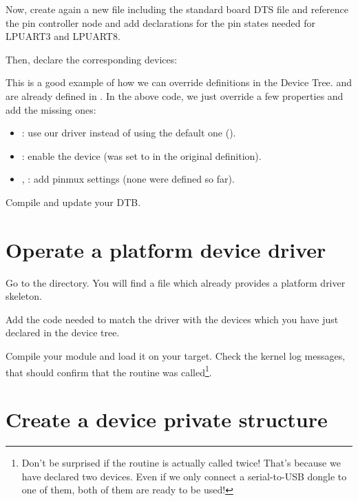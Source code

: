 Now, create again a new
 file including
the standard board DTS file and reference the pin controller node and add declarations for the pin states needed for LPUART3 and LPUART8.

{\scriptsize {}}

Then, declare the corresponding devices:


This is a good example of how we can override definitions in the Device
Tree.  and  are already defined in
. In the above code, we
just override a few properties and add the missing ones:

\begin{itemize}
\item {}: use our driver instead of using the default one
      ().
\item {}: enable the device (was set to  in
      the original definition).
\item {}, : add pinmux settings
      (none were defined so far).
\end{itemize}

Compile and update your DTB.

\section{Operate a platform device driver}

Go to the  directory.
You will find a  file which already provides a platform
driver skeleton.

Add the code needed to match the driver with the devices which you have
just declared in the device tree.

Compile your module and load it on your target. Check the kernel log
messages, that should confirm that the  routine was
called\footnote{Don't be surprised if the  routine is
actually called twice! That's because we have declared two devices.
Even if we only connect a serial-to-USB dongle to one of them, both
of them are ready to be used!}.

\section{Create a device private structure}

